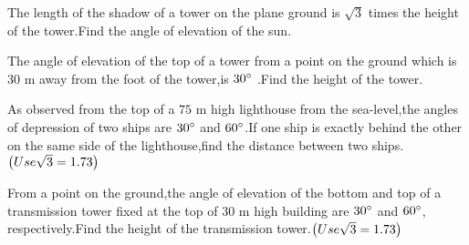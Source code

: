 
\item The length of the shadow of a tower on the plane ground is $\sqrt{3}$ times the height of the tower.Find the angle of elevation of the sun.

\hfill{}\item  The angle of elevation of the top of a tower from a point on the ground which is $30$ m away from the foot of the tower,is $30\degree$ .Find the height of the tower.

\hfill{}\item  As observed from the top of a $75$ m high lighthouse from the sea-level,the angles of depression of two ships are $30\degree$ and $60\degree$.If one ship is exactly behind the other on the same side of the lighthouse,find the distance between two ships.$\left(Use \sqrt{3} = 1.73\right)$

\hfill{}\item  From a point on the ground,the angle of elevation of the bottom and top of a transmission tower fixed at the top of $30$ m high building are $30\degree$ and $60\degree$, respectively.Find the height of the transmission tower.$\left(Use \sqrt{3} = 1.73\right)$
 \hfill{}   








